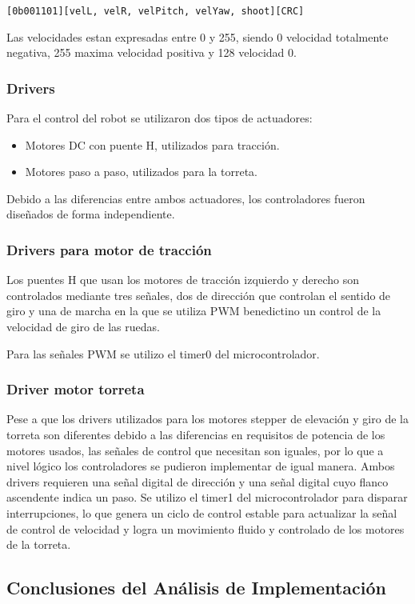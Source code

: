 \texttt{[0b001101][velL, velR, velPitch, velYaw, shoot][CRC]}


Las velocidades estan expresadas entre 0 y 255, siendo 0 velocidad totalmente negativa, 255 maxima velocidad positiva y 128 velocidad 0.

\subsubsection{Drivers}
Para el control del robot se utilizaron dos tipos de actuadores:
\begin{itemize}
    \item Motores DC con puente H, utilizados para tracción.

    \item Motores paso a paso, utilizados para la torreta.
\end{itemize}
Debido a las diferencias entre ambos actuadores, los controladores fueron diseñados de forma independiente.
\subsubsection{Drivers para motor de tracción}
Los puentes H que usan los motores de tracción izquierdo y derecho son controlados mediante tres señales, dos de dirección que controlan el sentido de giro y una de marcha en la que se utiliza PWM benedictino un control de la velocidad de giro de las ruedas.

Para las señales PWM se utilizo el timer0 del microcontrolador.
\subsubsection{Driver motor torreta}
Pese a que los drivers utilizados para los motores stepper de elevación y giro de la torreta son diferentes debido a las diferencias en requisitos de potencia de los motores usados, las señales de control que necesitan son iguales, por lo que a nivel lógico los controladores se pudieron implementar de igual manera.
Ambos drivers requieren una señal digital de dirección y una señal digital cuyo flanco ascendente indica un paso.
Se utilizo el timer1 del microcontrolador para disparar interrupciones, lo que genera un ciclo de control estable para actualizar la señal de control de velocidad y logra un movimiento fluido y controlado de los motores de la torreta.

\subsection{Conclusiones del Análisis de Implementación}

